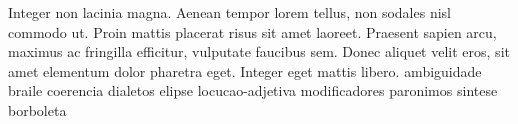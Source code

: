 \lipsum[20]

	
	\begin{quadro}[h!]	
		\centering
	\end{quadro}

\lipsum[21]

Integer non lacinia magna. Aenean tempor lorem tellus, non sodales nisl commodo ut. Proin mattis placerat risus sit amet laoreet. Praesent sapien arcu, maximus ac fringilla efficitur, vulputate faucibus sem. Donec aliquet velit eros, sit amet elementum dolor pharetra eget. Integer eget mattis libero.
\Gls{ambiguidade}
\Gls{braile}
\Gls{coerencia}
\Gls{dialetos}
\Gls{elipse}
\Gls{locucao-adjetiva}
\Gls{modificadores}
\Gls{paronimos}
\Gls{sintese}
\Gls{borboleta}